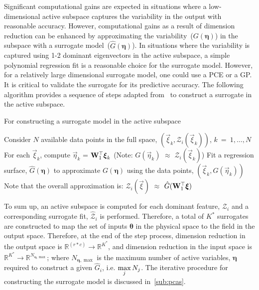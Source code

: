Significant computational gains are expected in situations where a low-dimensional active subspace captures the
variability in the output with reasonable accuracy. However, computational gains as a result of dimension reduction
can be enhanced by approximating the variability~($G(\bm{\eta})$) in the subspace with a surrogate
model~($\hat{G}(\bm{\eta})$). In situations where the variability is captured using 1-2 dominant eigenvectors in
the active subspace, a simple polynomial regression fit is a reasonable choice for the surrogate model. 
However, for a relatively large dimensional surrogate model, one could
use a PCE or a GP. It is critical to validate the surrogate for its predictive accuracy. 
The following algorithm provides a sequence of steps adapted from~\cite{Constantine:2015} to construct a
surrogate in the active subspace.
%
\begin{breakablealgorithm}
\renewcommand{\algorithmicrequire}{\textbf{Input:}}
\renewcommand{\algorithmicensure}{\textbf{Output:}}
  \caption{For constructing a surrogate model in the active subspace}
  \begin{algorithmic}[1]
	  \State Consider $N$ available data points in the full space, $(\vec\xi_k,\mathcal{Z}_i(\vec\xi_k))$, $k~=~1,\ldots,N$
	  \State For each $\vec\xi_k$, compute $\vec\eta_k$ = $\mat{W}_1^\top\vec\xi_k$ 
          (Note: $G(\vec{\eta}_k)$ $\approx$ $\mathcal{Z}_i(\vec{\xi}_k)$)
	  \State Fit a regression surface, $\hat{G}(\bm{\eta})$ to approximate $G(\bm{\eta})$ using the data
                 points, $(\vec\xi_k,G(\vec\eta_k))$
	  \State Note that the overall approximation is: $\mathcal{Z}_i(\vec{\xi})$ $\approx$
                 $\hat{G}(\mat{W}_1^\top\vec{\xi})$ 
	\EndProcedure
  \end{algorithmic}
  \label{alg:surr}
\end{breakablealgorithm} 
%

\bigskip
To sum up, an active subspace is computed for each dominant feature, $\mathcal{Z}_i$ and a corresponding
surrogate fit, $\hat{\mathcal{Z}}_i$ is performed. Therefore, a total of $K^\ast$ surrogates are constructed
to map the set of inputs $\bm{\theta}$ in the physical space to the field in the output space. 
Therefore, at the end of the step process, dimension reduction in the output space is 
$\mathbb{R}^{(r\ast c)}\rightarrow \mathbb{R}^{K^\ast}$, and dimension reduction in the input space
is $\mathbb{R}^{K^\ast}\rightarrow \mathbb{R}^{N_{\bm{\eta},\max}}$; 
where $N_{\bm{\eta},\max}$ is the maximum number of active variables, $\bm{\eta}$ required to construct
a given $\hat{G}_i$, i.e. $\max\limits_j {N_j}$. The iterative procedure for constructing the surrogate model is
discussed in~\ref{sub:pcas}.

